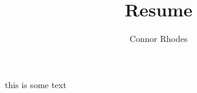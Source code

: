 \documentclass{article}
\author{Connor Rhodes}
\title{Resume}
\begin{document}
this is some text
\end{document}
